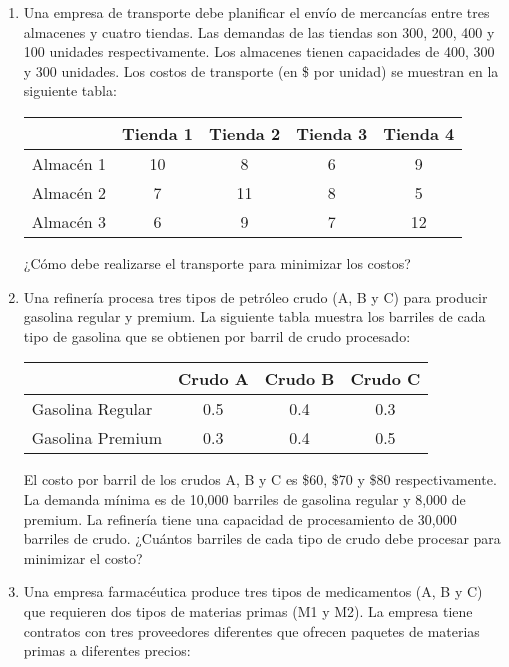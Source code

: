 \documentclass[12pt]{article}
\begin{document}
\begin{enumerate}
\item Una empresa de transporte debe planificar el envío de mercancías entre tres almacenes y cuatro tiendas. Las demandas de las tiendas son 300, 200, 400 y 100 unidades respectivamente. Los almacenes tienen capacidades de 400, 300 y 300 unidades. Los costos de transporte (en \$ por unidad) se muestran en la siguiente tabla:

\begin{center}
\begin{tabular}{lcccc}
\toprule
& Tienda 1 & Tienda 2 & Tienda 3 & Tienda 4 \\
\midrule
Almacén 1 & 10 & 8 & 6 & 9 \\
Almacén 2 & 7 & 11 & 8 & 5 \\
Almacén 3 & 6 & 9 & 7 & 12 \\
\bottomrule
\end{tabular}
\end{center}

¿Cómo debe realizarse el transporte para minimizar los costos?

\item Una refinería procesa tres tipos de petróleo crudo (A, B y C) para producir gasolina regular y premium. La siguiente tabla muestra los barriles de cada tipo de gasolina que se obtienen por barril de crudo procesado:

\begin{center}
\begin{tabular}{lccc}
\toprule
& Crudo A & Crudo B & Crudo C \\
\midrule
Gasolina Regular & 0.5 & 0.4 & 0.3 \\
Gasolina Premium & 0.3 & 0.4 & 0.5 \\
\bottomrule
\end{tabular}
\end{center}

El costo por barril de los crudos A, B y C es \$60, \$70 y \$80 respectivamente. La demanda mínima es de 10,000 barriles de gasolina regular y 8,000 de premium. La refinería tiene una capacidad de procesamiento de 30,000 barriles de crudo. ¿Cuántos barriles de cada tipo de crudo debe procesar para minimizar el costo?

\item Una empresa farmacéutica produce tres tipos de medicamentos (A, B y C) que requieren dos tipos de materias primas (M1 y M2). La empresa tiene contratos con tres proveedores diferentes que ofrecen paquetes de materias primas a diferentes precios:


\end{enumerate}
\end{document}
